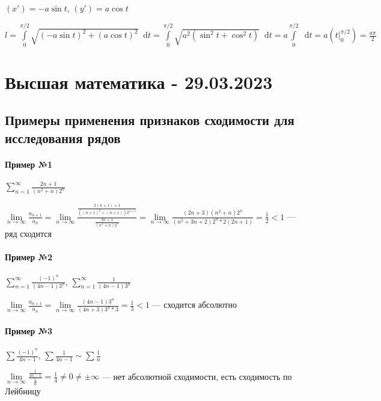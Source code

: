 \documentclass{article}
\newcommand*\diff{\mathop{}\!\mathrm{d}}
\begin{document}
$(x') = - a \sin t$, $(y') = a \cos t$

$l = \int\limits_{0}^{\pi/2} \sqrt{(-a \sin t)^2 + (a \cos t)^2} \diff t = \int\limits_{0}^{\pi/2} \sqrt{a^2 (\sin^2 t + \cos^2 t)} \diff t = a \int\limits_{0}^{\pi/2} \diff t = a (t \bigg|_{0}^{\pi/2}) = \frac{a \pi}{2}$

\pagebreak
\section{Высшая математика - 29.03.2023}

\subsection{Примеры применения признаков сходимости для исследования рядов}

\paragraph{Пример №1}

$\sum\limits_{n = 1}^{\infty} \frac{2 n + 1}{(n^2 + n) 2^n}$

$\lim\limits_{n \to \infty} \frac{a_{n + 1}}{a_{n}} = \lim\limits_{n \to \infty} \frac{\frac{2 ( n + 1 ) + 1}{((n + 1)^2 + (n + 1)) 2^{n + 1}}}{\frac{2 n + 1}{(n^2 + n) 2^n}} = \lim\limits_{n \to \infty} \frac{(2 n + 3) (n^2 + n) 2^{n}}{(n^2 + 3 n + 2) 2^{n} * 2 (2 n + 1)} = \frac{1}{2} < 1$ — ряд сходится

\paragraph{Пример №2}

$\sum\limits_{n = 1}^{\infty} \frac{(-1)^{n}}{(4 n - 1) 3^{n}}$, $\sum\limits_{n = 1}^{\infty} \frac{1}{(4 n -1) 3^{n}}$

$\lim\limits_{n \to \infty} \frac{a_{n + 1}}{a_{n}} = \lim\limits_{n \to \infty} \frac{(4 n - 1) 3^{n}}{(4 n + 3) 3^{n} * 3} = \frac{1}{3} < 1$ — сходится абсолютно

\paragraph{Пример №3}

$\sum \frac{(-1)^{n}}{4 n - 1}$, $\sum \frac{1}{4 n - 1} \sim \sum \frac{1}{n}$

$\lim\limits_{n \to \infty} \frac{\frac{1}{4 n - 1}}{\frac{1}{n}} = \frac{1}{4} \ne 0 \ne \pm \infty$ — нет абсолютной сходимости, есть сходимость по Лейбницу
\end{document}
